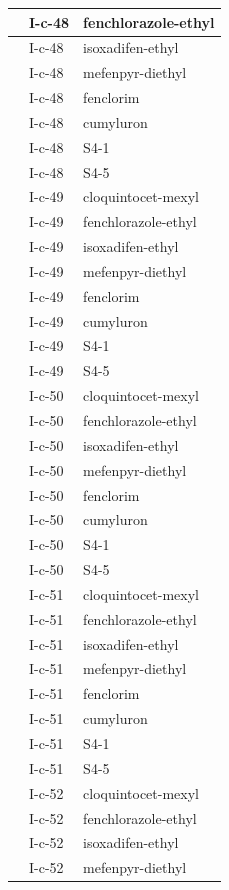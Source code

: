 \documentclass[11pt,a4paper]{article}
\begin{document}
\begin{table}[h]
\begin{tabular}{|l|l|l|}
 & I-c-48 & fenchlorazole-ethyl \\ \hline
 & I-c-48 & isoxadifen-ethyl \\ \hline
 & I-c-48 & mefenpyr-diethyl \\ \hline
 & I-c-48 & fenclorim \\ \hline
 & I-c-48 & cumyluron \\ \hline
 & I-c-48 & S4-1 \\ \hline
 & I-c-48 & S4-5 \\ \hline
 & I-c-49 & cloquintocet-mexyl \\ \hline
 & I-c-49 & fenchlorazole-ethyl \\ \hline
 & I-c-49 & isoxadifen-ethyl \\ \hline
 & I-c-49 & mefenpyr-diethyl \\ \hline
 & I-c-49 & fenclorim \\ \hline
 & I-c-49 & cumyluron \\ \hline
 & I-c-49 & S4-1 \\ \hline
 & I-c-49 & S4-5 \\ \hline
 & I-c-50 & cloquintocet-mexyl \\ \hline
 & I-c-50 & fenchlorazole-ethyl \\ \hline
 & I-c-50 & isoxadifen-ethyl \\ \hline
 & I-c-50 & mefenpyr-diethyl \\ \hline
 & I-c-50 & fenclorim \\ \hline
 & I-c-50 & cumyluron \\ \hline
 & I-c-50 & S4-1 \\ \hline
 & I-c-50 & S4-5 \\ \hline
 & I-c-51 & cloquintocet-mexyl \\ \hline
 & I-c-51 & fenchlorazole-ethyl \\ \hline
 & I-c-51 & isoxadifen-ethyl \\ \hline
 & I-c-51 & mefenpyr-diethyl \\ \hline
 & I-c-51 & fenclorim \\ \hline
 & I-c-51 & cumyluron \\ \hline
 & I-c-51 & S4-1 \\ \hline
 & I-c-51 & S4-5 \\ \hline
 & I-c-52 & cloquintocet-mexyl \\ \hline
 & I-c-52 & fenchlorazole-ethyl \\ \hline
 & I-c-52 & isoxadifen-ethyl \\ \hline
 & I-c-52 & mefenpyr-diethyl \\ \hline

\end{tabular}
\end{table}
\end{document}
